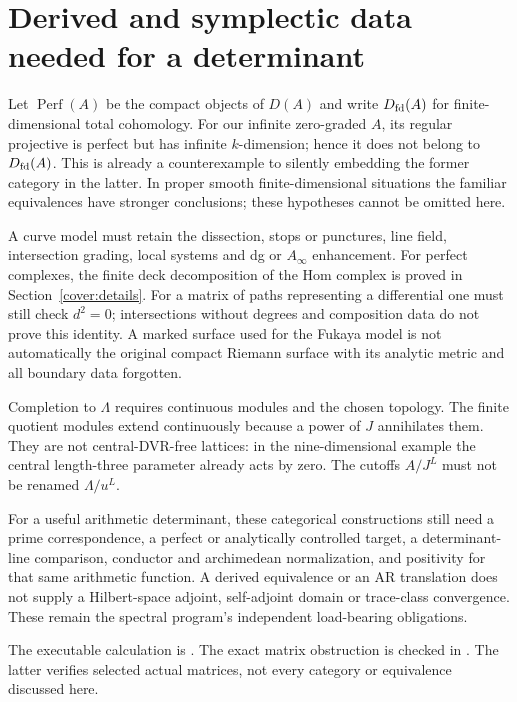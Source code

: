 \section{Derived and symplectic data needed for a determinant}
Let $\operatorname{Perf}(A)$ be the compact objects of $D(A)$ and write
$D_{\rm fd}(A)$ for finite-dimensional total cohomology. For our infinite
zero-graded $A$, its regular projective is perfect but has infinite
$k$-dimension; hence it does not belong to $D_{\rm fd}(A)$. This is already
a counterexample to silently embedding the former category in the latter.
In proper smooth finite-dimensional situations the familiar equivalences
have stronger conclusions; these hypotheses cannot be omitted here.

A curve model must retain the dissection, stops or punctures, line field,
intersection grading, local systems and dg or $A_\infty$ enhancement.
For perfect complexes, the finite deck decomposition of the Hom complex is
proved in Section~\ref{cover:details}. For a matrix of paths representing a
differential one must still check $d^2=0$; intersections without degrees and
composition data do not prove this identity. A marked surface used for the
Fukaya model is not automatically the original compact Riemann surface
with its analytic metric and all boundary data forgotten.

Completion to $\Lambda$ requires continuous modules and the chosen topology.
The finite quotient modules extend continuously because a power of $J$
annihilates them. They are not central-DVR-free lattices: in the
nine-dimensional example the central length-three parameter already acts
by zero. The cutoffs $A/J^L$ must not be renamed $\Lambda/u^L$.

For a useful arithmetic determinant, these categorical constructions still
need a prime correspondence, a perfect or analytically controlled target,
a determinant-line comparison, conductor and archimedean normalization,
and positivity for that same arithmetic function. A derived equivalence
or an AR translation does not supply a Hilbert-space adjoint, self-adjoint
domain or trace-class convergence. These remain the spectral program's
independent load-bearing obligations.

The executable calculation is .
The exact matrix obstruction is checked in .
The latter verifies selected actual matrices, not every category or
equivalence discussed here.

